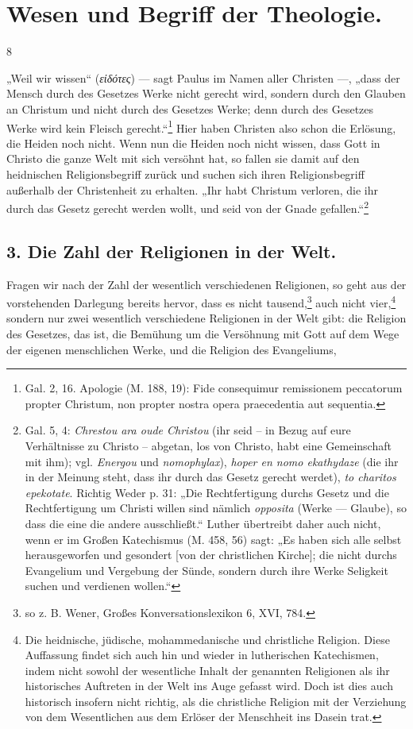 \section*{Wesen und Begriff der Theologie.}\hfill 8

„Weil wir wissen“ (\textit{εἰδότες}) — sagt Paulus im Namen aller Christen —, „dass der Mensch durch des Gesetzes Werke nicht gerecht wird, sondern durch den Glauben an Christum und nicht durch des Gesetzes Werke; denn durch des Gesetzes Werke wird kein Fleisch gerecht.“\footnote{Gal. 2, 16. Apologie (M. 188, 19): Fide consequimur remissionem peccatorum propter Christum, non propter nostra opera praecedentia aut sequentia.} Hier haben Christen also schon die Erlösung, die Heiden noch nicht. Wenn nun die Heiden noch nicht wissen, dass Gott in Christo die ganze Welt mit sich versöhnt hat, so fallen sie damit auf den heidnischen Religionsbegriff zurück und suchen sich ihren Religionsbegriff außerhalb der Christenheit zu erhalten. „Ihr habt Christum verloren, die ihr durch das Gesetz gerecht werden wollt, und seid von der Gnade gefallen.“\footnote{Gal. 5, 4: \textit{Chrestou ara oude Christou} (ihr seid – in Bezug auf eure Verhältnisse zu Christo – abgetan, los von Christo, habt eine Gemeinschaft mit ihm); vgl. \textit{Energou} und \textit{nomophylax}), \textit{hoper en nomo ekathydaze} (die ihr in der Meinung steht, dass ihr durch das Gesetz gerecht werdet), \textit{to charitos epekotate}. Richtig Weder p. 31: „Die Rechtfertigung durchs Gesetz und die Rechtfertigung um Christi willen sind nämlich \textit{opposita} (Werke — Glaube), so dass die eine die andere ausschließt.“ Luther übertreibt daher auch nicht, wenn er im Großen Katechismus (M. 458, 56) sagt: „Es haben sich alle selbst herausgeworfen und gesondert [von der christlichen Kirche]; die nicht durchs Evangelium und Vergebung der Sünde, sondern durch ihre Werke Seligkeit suchen und verdienen wollen.“}

\subsection*{3. Die Zahl der Religionen in der Welt.}

Fragen wir nach der Zahl der wesentlich verschiedenen Religionen, so geht aus der vorstehenden Darlegung bereits hervor, dass es nicht tausend,\footnote{so z. B. Wener, Großes Konversationslexikon 6, XVI, 784.} auch nicht vier,\footnote{Die heidnische, jüdische, mohammedanische und christliche Religion. Diese Auffassung findet sich auch hin und wieder in lutherischen Katechismen, indem nicht sowohl der wesentliche Inhalt der genannten Religionen als ihr historisches Auftreten in der Welt ins Auge gefasst wird. Doch ist dies auch historisch insofern nicht richtig, als die christliche Religion mit der Verziehung von dem Wesentlichen aus dem Erlöser der Menschheit ins Dasein trat.} sondern nur zwei wesentlich verschiedene Religionen in der Welt gibt: die Religion des Gesetzes, das ist, die Bemühung um die Versöhnung mit Gott auf dem Wege der eigenen menschlichen Werke, und die Religion des Evangeliums,